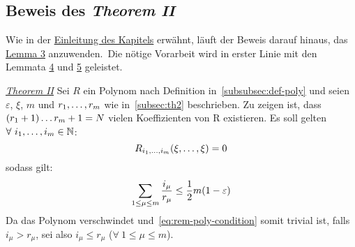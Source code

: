     \subsection{Beweis des \emph{Theorem II}}
        \label{subsec:proof-th2}
        \textrm{Wie in der \hyperref[sec:th2]{Einleitung des Kapitels} erwähnt, läuft der Beweis darauf hinaus, das \hyperref
        [subsec:lemma3]{Lemma 3} anzuwenden.\ Die nötige Vorarbeit wird in erster Linie mit den Lemmata \hyperref
        [subsec:lemma4]{4} und \hyperref[subsec:lemma5]{5} geleistet.}
        \begin{proofname}{\emph{\hyperref[subsec:th2]{Theorem II}}}
            Sei $R$ ein Polynom nach Definition in~\ref{subsubsec:def-poly} und seien $\varepsilon$, $\xi$, $m$ und $r_1, \dots, r_m$ wie in~\ref{subsec:th2} beschrieben.
            \newline
            Zu zeigen ist, dass $(r_1+1) \dots {r_m+1} = N$ vielen Koeffizienten von R existieren.
            \newline 
            Es soll gelten $\forall \ i_1, \dots, i_m \in \mathbb{N}$:
            \begin{equation}
                R_{i_1, \dots, i_m}(\xi, \dots, \xi) = 0 \label{eq:rem-poly-condition}
            \end{equation}
            sodass gilt:
            \begin{equation*}
                \sum_{1 \leq \mu \leq m} \frac{i_\mu}{r_\mu} \leq \frac{1}{2} m(1 - \varepsilon)
            \end{equation*}
            Da das Polynom verschwindet und~\eqref{eq:rem-poly-condition} somit trivial ist, falls $i_\mu > r_\mu$, sei
            also $i_\mu \leq r_\mu$ ($\forall \ 1 \leq \mu \leq m$).
        \end{proofname}
    
